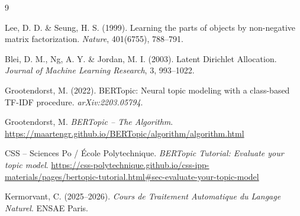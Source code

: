 \documentclass{article}
\begin{document}
\begin{thebibliography}{9}

Lee, D. D. \& Seung, H. S. (1999).
\newblock Learning the parts of objects by non-negative matrix factorization.
\newblock \textit{Nature}, 401(6755), 788--791.

Blei, D. M., Ng, A. Y. \& Jordan, M. I. (2003).
\newblock Latent Dirichlet Allocation.
\newblock \textit{Journal of Machine Learning Research}, 3, 993--1022.

Grootendorst, M. (2022).
\newblock BERTopic: Neural topic modeling with a class-based TF-IDF procedure.
\newblock \textit{arXiv:2203.05794}.

Grootendorst, M.
\newblock \textit{BERTopic -- The Algorithm}.
\newblock \url{https://maartengr.github.io/BERTopic/algorithm/algorithm.html}

CSS -- Sciences Po / École Polytechnique.
\newblock \textit{BERTopic Tutorial: Evaluate your topic model}.
\newblock \url{https://css-polytechnique.github.io/css-ipp-materials/pages/bertopic-tutorial.html\#sec-evaluate-your-topic-model}

Kermorvant, C. (2025--2026).
\newblock \textit{Cours de Traitement Automatique du Langage Naturel}.
\newblock ENSAE Paris.

\end{thebibliography}
\newpage
\end{document}
